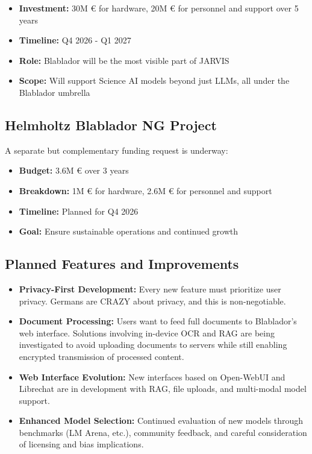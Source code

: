 \documentclass[10pt,conference]{IEEEtran}
\begin{document}
\begin{itemize}
    \item \textbf{Investment:} 30M € for hardware, 20M € for personnel and support over 5 years
    \item \textbf{Timeline:} Q4 2026 - Q1 2027
    \item \textbf{Role:} Blablador will be the most visible part of JARVIS
    \item \textbf{Scope:} Will support Science AI models beyond just LLMs, all under the Blablador umbrella
\end{itemize}

\subsection{Helmholtz Blablador NG Project}
A separate but complementary funding request is underway:

\begin{itemize}
    \item \textbf{Budget:} 3.6M € over 3 years
    \item \textbf{Breakdown:} 1M € for hardware, 2.6M € for personnel and support
    \item \textbf{Timeline:} Planned for Q4 2026
    \item \textbf{Goal:} Ensure sustainable operations and continued growth
\end{itemize}

\subsection{Planned Features and Improvements}
\begin{itemize}
    \item \textbf{Privacy-First Development:} Every new feature must prioritize user privacy. Germans are CRAZY about privacy, and this is non-negotiable.
    
    \item \textbf{Document Processing:} Users want to feed full documents to Blablador's web interface. Solutions involving in-device OCR and RAG are being investigated to avoid uploading documents to servers while still enabling encrypted transmission of processed content.
    
    \item \textbf{Web Interface Evolution:} New interfaces based on Open-WebUI and Librechat are in development with RAG, file uploads, and multi-modal model support.
    
    \item \textbf{Enhanced Model Selection:} Continued evaluation of new models through benchmarks (LM Arena, etc.), community feedback, and careful consideration of licensing and bias implications.
\end{itemize}
\end{document}
